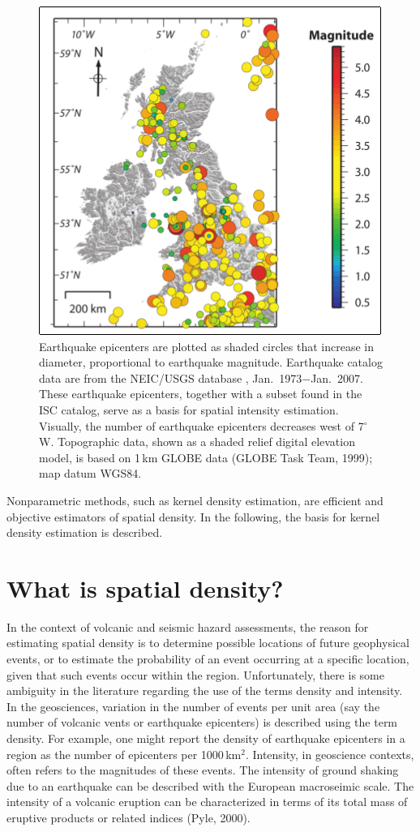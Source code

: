 \documentclass[10pt]{article}
\begin{document}
\begin{figure}[!ht]
    \centering
    \includegraphics[scale=.60]{figures/UK_equakes.png}
    \caption{Earthquake epicenters are plotted as shaded circles that increase in diameter, proportional to earthquake magnitude. Earthquake catalog data are from the NEIC/USGS database , Jan.~1973$-$Jan.~2007. These earthquake epicenters, together with a subset found in the ISC catalog, serve as a basis for spatial intensity estimation. Visually, the number of earthquake epicenters decreases west of 7$^\circ$\,W. Topographic data, shown as a shaded relief digital elevation model, is based on 1\,km GLOBE data (GLOBE Task Team, 1999); map datum WGS84.}
    \label{fig_eqs}
\end{figure}
Nonparametric methods, such as kernel density estimation, are efficient and objective estimators of spatial density. In the following, the basis for kernel density estimation is described.

\section{ What is spatial density? }
In the context of volcanic and seismic hazard assessments, the reason for estimating spatial density is to determine possible locations of future geophysical events, or to estimate the probability of an event occurring at a specific location, given that such events occur within the region. Unfortunately, there is some ambiguity in the literature regarding the use of the terms density and intensity. In the geosciences, variation in the number of events per unit area (say the number of volcanic vents or earthquake epicenters) is described using the term density. For example, one might report the density of earthquake epicenters in a region as the number of epicenters per 1000\,km$^2$. Intensity, in geoscience contexts, often refers to the magnitudes of these events. The intensity of ground shaking due to an earthquake can be described with the European macroseimic scale. The intensity of a volcanic eruption can be characterized in terms of its total mass of eruptive products or related indices (Pyle, 2000).
\end{document}
